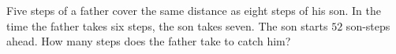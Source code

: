 Five steps of a father cover the same distance as eight steps of his son. In the time the father takes six steps, the son takes seven. The son starts $52$ son-steps ahead. How many steps does the father take to catch him?
